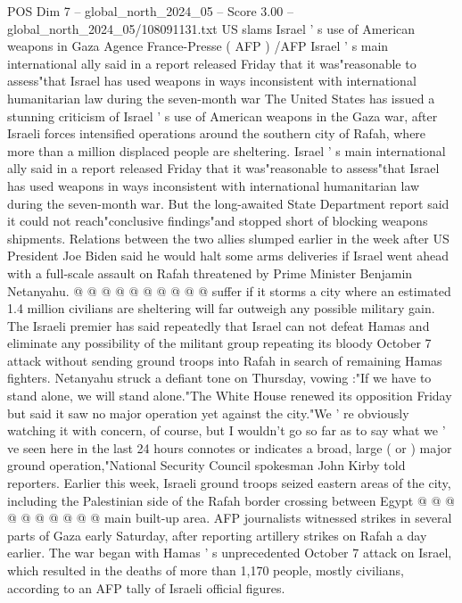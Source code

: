 \begin{textsample}{POS Dim 7 – global\_north\_2024\_05 – Score 3.00 – global\_north\_2024\_05/108091131.txt}  \label{ex:f7_pos_264}
US slams Israel ' s use of American weapons in Gaza Agence France-Presse ( AFP ) /AFP Israel ' s main international ally said in a report released Friday that it was"reasonable to assess"that Israel has used weapons in ways inconsistent with international humanitarian law during the seven-month war The United States has issued a stunning criticism of Israel ' s use of American weapons in the Gaza war, after Israeli forces intensified operations around the southern city of Rafah, where more than a million displaced people are sheltering.
Israel ' s main international ally said in a report released Friday that it was"reasonable to assess"that Israel has used weapons in ways inconsistent with international humanitarian law during the seven-month war.
But the long-awaited State Department report said it could not reach"conclusive findings"and stopped short of blocking weapons shipments.
Relations between the two allies slumped earlier in the week after US President Joe Biden said he would halt some arms deliveries if Israel went ahead with a full-scale assault on Rafah threatened by Prime Minister Benjamin Netanyahu. @ @ @ @ @ @ @ @ @ @ suffer if it storms a city where an estimated 1.4 million civilians are sheltering will far outweigh any possible military gain.
The Israeli premier has said repeatedly that Israel can not defeat Hamas and eliminate any possibility of the militant group repeating its bloody October 7 attack without sending ground troops into Rafah in search of remaining Hamas fighters.
Netanyahu struck a defiant tone on Thursday, vowing :"If we have to stand alone, we will stand alone."The White House renewed its opposition Friday but said it saw no major operation yet against the city."We ' re obviously watching it with concern, of course, but I wouldn't go so far as to say what we ' ve seen here in the last 24 hours connotes or indicates a broad, large ( or ) major ground operation,"National Security Council spokesman John Kirby told reporters.
Earlier this week, Israeli ground troops seized eastern areas of the city, including the Palestinian side of the Rafah border crossing between Egypt @ @ @ @ @ @ @ @ @ @ main built-up area.
AFP journalists witnessed strikes in several parts of Gaza early Saturday, after reporting artillery strikes on Rafah a day earlier.
The war began with Hamas ' s unprecedented October 7 attack on Israel, which resulted in the deaths of more than 1,170 people, mostly civilians, according to an AFP tally of Israeli official figures.

\end{textsample}
